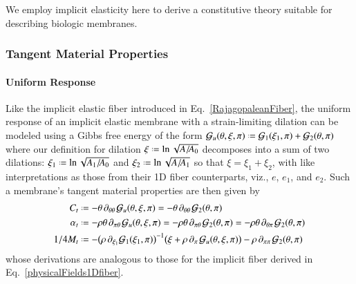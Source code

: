 We employ implicit elasticity here to derive a constitutive theory suitable for describing biologic membranes.

\subsubsection{Tangent Material Properties}

\paragraph{Uniform Response}

Like the implicit elastic fiber introduced in Eq.~\ref{RajagopaleanFiber}, the uniform response of an implicit elastic membrane with a strain-limiting dilation can be modeled using a Gibbs free energy of the form $\mathcal{G}_u (\theta , \xi , \pi ) \defeq \mathcal{G}_1 (\xi_1 ,\pi) + \mathcal{G}_2 (\theta , \pi)$ where our definition for dilation $\xi \defeq \ln \sqrt{A / \! A_0}$ decomposes into a sum of two dilations: $\xi_1 \defeq \ln \sqrt{A_1 / \! A_0}$ and $\xi_2 \defeq \ln \sqrt{A / \! A_1}$ so that $\xi = \xi_1 + \xi_2$, with like interpretations as those from their 1D fiber counterparts, viz., $e$, $e_1$, and $e_2$.  Such a membrane's tangent material properties are then given by
\begin{subequations}
    \label{physicalFields2Dmembrane}
    \begin{align}
    C_t & \defeq 
    -\theta \, \partial_{\theta\theta\,} 
    \mathcal{G}_u  (\theta , \xi , \pi) =
    -\theta \, \partial_{\theta\theta\,} 
    \mathcal{G}_2 (\theta , \pi)
    \label{specificHeat2Dmembrane} \\
    \alpha_t & \defeq 
    -\rho\theta \, \partial_{\pi\theta\,} 
    \mathcal{G}_u (\theta , \xi , \pi) =
    -\rho\theta \, \partial_{\pi\theta\,} 
    \mathcal{G}_2 (\theta , \pi)  =
    -\rho\theta \, \partial_{\theta\pi\,} 
    \mathcal{G}_2 (\theta , \pi)
    \label{thermalExpansion2Dmembrane} \\
    1/4M_t & \defeq -
    \bigl( \rho \, \partial_{\xi_1} \mathcal{G}_1 ( \xi_1, \pi ) \bigr)^{-1} 
    \bigl( \xi + \rho \, \partial_{\pi\,} \mathcal{G}_u (\theta , \xi , \pi ) \bigr)  -
    \rho \, \partial_{\pi\pi\,} \mathcal{G}_2(\theta , \pi)
    \label{compliance2Dmembrane}
    \end{align}
\end{subequations}
whose derivations are analogous to those for the implicit fiber derived in Eq.~\ref{physicalFields1Dfiber}. 

